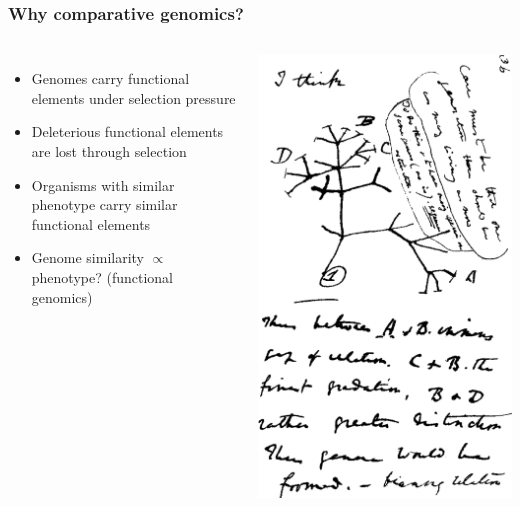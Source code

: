%
\begin{frame}
  \frametitle{Why comparative genomics?}
    \begin{columns}[c] 
        \begin{itemize}
         \item \textcolor{hutton_green}{Genomes carry functional elements under selection pressure}
         \item \textcolor{hutton_blue}{Deleterious functional elements are lost through selection}         
         \item \textcolor{hutton_purple}{Organisms with similar phenotype carry similar functional elements}
         \item \textcolor{RawSienna}{Genome similarity $\propto$ phenotype? (functional genomics)}         
        \end{itemize}
        \includegraphics[width=\textwidth]{images/darwin_tree}
    \end{columns}  
\end{frame}

